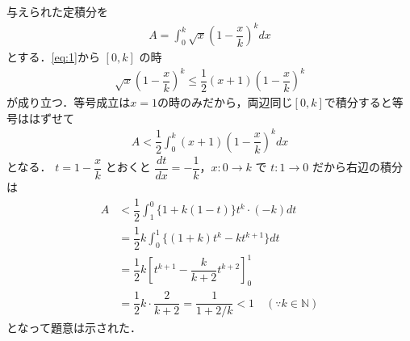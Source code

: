 \documentclass[../../main.tex]{subfiles}
\begin{document}
与えられた定積分を
\begin{align}
  A = \int_0^k\sqrt{x}{ \left( 1-\dfrac{x}{k} \right) }^kdx \label{eq:2}
\end{align}
とする．\cref{eq:1}から $[0, k]$ の時
\begin{align}
  \sqrt{x}\left(1 - \dfrac{x}{k}\right)^k \le \dfrac{1}{2}(x+1)\left(1 - \dfrac{x}{k}\right)^k
\end{align}
が成り立つ．等号成立は$x=1$の時のみだから，両辺同じ$[0,k]$で積分すると等号ははずせて
\begin{align}
  A < \dfrac{1}{2}\int_0^k (x+1)\left(1 - \dfrac{x}{k}\right)^k dx
\end{align}
となる．
$t = 1 - \dfrac{x}{k}$ とおくと $\dfrac{dt}{dx} = -\dfrac{1}{k}$，$x : 0 \to k$ で $t : 1 \to 0$ だから右辺の積分は
\begin{align}
  A &< \dfrac{1}{2} \int_1^0 \{1 + k(1-t)\} t^k \cdot (-k) dt \\
  &= \dfrac{1}{2} k \int_0^1 \{(1+k)t^k - k t^{k+1}\} dt \\
  &= \dfrac{1}{2} k \left[ t^{k+1} - \dfrac{k}{k+2} t^{k+2} \right]_0^1 \\
  &= \dfrac{1}{2} k \cdot \dfrac{2}{k+2} = \dfrac{1}{1 + 2/k} < 1 \quad (\because k \in \mathbb{N})
\end{align}
となって題意は示された．

\newpage
\end{document}
